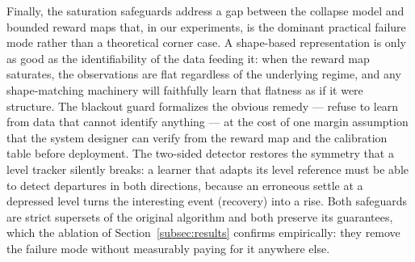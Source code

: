 \documentclass[11pt]{article}
\begin{document}
Finally, the saturation safeguards address a gap between the collapse model and bounded reward maps that, in our experiments, is the dominant practical failure mode rather than a theoretical corner case. A shape-based representation is only as good as the identifiability of the data feeding it: when the reward map saturates, the observations are flat regardless of the underlying regime, and any shape-matching machinery will faithfully learn that flatness as if it were structure. The blackout guard formalizes the obvious remedy --- refuse to learn from data that cannot identify anything --- at the cost of one margin assumption that the system designer can verify from the reward map and the calibration table before deployment. The two-sided detector restores the symmetry that a level tracker silently breaks: a learner that adapts its level reference must be able to detect departures in both directions, because an erroneous settle at a depressed level turns the interesting event (recovery) into a rise. Both safeguards are strict supersets of the original algorithm and both preserve its guarantees, which the ablation of Section~\ref{subsec:results} confirms empirically: they remove the failure mode without measurably paying for it anywhere else.
\end{document}
